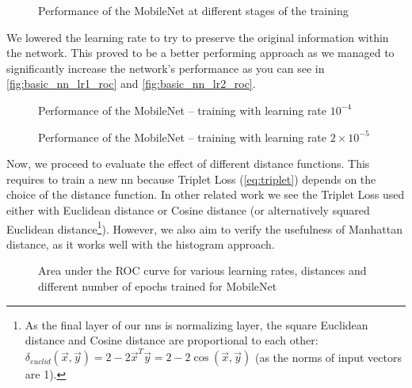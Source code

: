 \begin{figure}
    \centering
    \def\svgwidth{\columnwidth}
    
    \caption{Performance of the MobileNet at different stages of the training}
    \label{fig:basic_nn_overfit_roc}
\end{figure}

We lowered the learning rate to try to preserve the original information within the network. This proved to be a better performing approach as we managed to significantly increase the network's performance as you can see in \autoref{fig:basic_nn_lr1_roc} and \autoref{fig:basic_nn_lr2_roc}.

\begin{figure}
    \centering
    \def\svgwidth{\columnwidth}
    
    \caption{Performance of the MobileNet -- training with learning rate $10^{-4}$}
    \label{fig:basic_nn_lr1_roc}
\end{figure}

\begin{figure}
    \centering
    \def\svgwidth{\columnwidth}
    
    \caption{Performance of the MobileNet -- training with learning rate $2 \times 10^{-5}$}
    \label{fig:basic_nn_lr2_roc}
\end{figure}

Now, we proceed to evaluate the effect of different distance functions. This requires to train a new \gls{nn} because Triplet Loss (\autoref{eq:triplet}) depends on the choice of the distance function. In other related work we see the Triplet Loss used either with Euclidean distance or Cosine distance (or alternatively squared Euclidean distance\footnote{As the final layer of our \glspl{nn} is normalizing layer, the square Euclidean distance and Cosine distance are proportional to each other: $\delta_{euclid}(\vec{x}, \vec{y}) = 2 - 2\vec{x}^T\vec{y} = 2 - 2 \cos(\vec{x}, \vec{y})$ (as the norms of input vectors are 1).}). However, we also aim to verify the usefulness of Manhattan distance, as it works well with the histogram approach.

\begin{figure}
    \centering
    \large
    
    \def\svgwidth{\columnwidth}
    \scalebox{0.75}{}
    \vspace{1cm}

    
    \def\svgwidth{\columnwidth}
    \scalebox{0.75}{}
    \vspace{1cm}
    
    \def\svgwidth{\columnwidth}
    \scalebox{0.75}{
    }
    \caption{Area under the ROC curve for various learning rates, distances and different number of epochs trained for MobileNet}
    \label{fig:lr_heatmap}
\end{figure}

